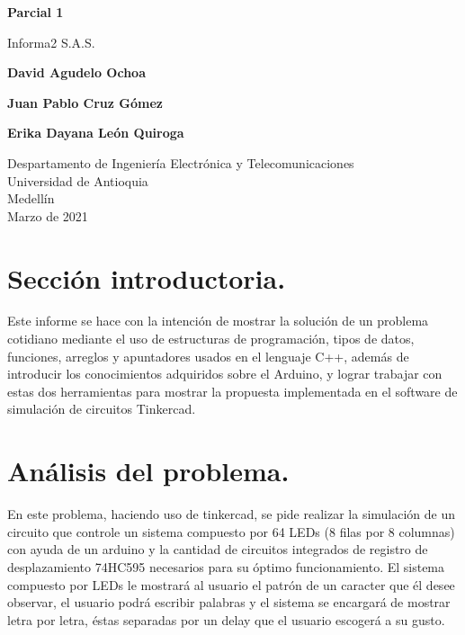 \documentclass{article}
\begin{document}
\begin{titlepage}
    \begin{center}
        \vspace*{0cm}
            
        \Huge
        \textbf{Parcial 1}
            
        \vspace{0.5cm}
        \LARGE
        Informa2 S.A.S.
            
        \vspace{5cm}
            
        \textbf{David Agudelo Ochoa}
        
        \vspace{0.5cm}
        
        \textbf{Juan Pablo Cruz Gómez}
        
        \vspace{0.5cm}
        
        \textbf{Erika Dayana León Quiroga}
            
        \vfill
            
        \vspace{0.8cm}
            
        \Large
        Despartamento de Ingeniería Electrónica y Telecomunicaciones\\
        Universidad de Antioquia\\
        Medellín\\
        Marzo de 2021
            
    \end{center}
\end{titlepage}

\tableofcontents
\newpage
\section{Sección introductoria.}\label{intro}
Este informe se hace con la intención de mostrar la solución de un problema cotidiano mediante el uso de  estructuras de programación, tipos de datos, funciones, arreglos y apuntadores usados en el lenguaje C++, además de introducir los conocimientos adquiridos sobre el Arduino, y lograr trabajar con estas dos herramientas para mostrar la propuesta implementada en el software de simulación de circuitos Tinkercad.

\section{Análisis del problema.} \label{contenido}
En este problema, haciendo uso de tinkercad, se pide realizar la simulación de un circuito que controle un sistema compuesto por 64 LEDs (8 filas por 8 columnas) con ayuda de un arduino y la cantidad de circuitos integrados de registro de desplazamiento 74HC595 necesarios para su óptimo funcionamiento. El sistema compuesto por LEDs le mostrará al usuario el patrón de un caracter que él desee observar, el usuario podrá escribir palabras y el sistema se encargará de mostrar letra por letra, éstas separadas por un delay que el usuario escogerá a su gusto.
\end{document}

